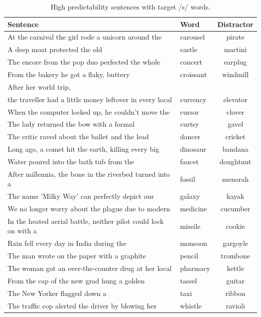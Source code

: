 \begin{table}[!ht]
\caption{High predictability sentences with target /s/ words.}
\label{tbl:senthighs}
\small
\centering
\begin{tabular}{llc}
\toprule
Sentence                                                                     & Word        & Distractor  \\
\midrule
At the carnival the girl rode a unicorn around the & carousel & pirate \\
A deep moat protected the old & castle & martini \\
The encore from the pop duo perfected the whole & concert & earplug \\
From the bakery he got a flaky, buttery & croissant & windmill \\
After her world trip, & & \\
the traveller had a little money leftover in every local & currency & elevator \\
When the computer locked up, he couldn't move the & cursor & clover \\
The lady returned the bow with a formal & curtsy & gavel \\
The critic raved about the ballet and the lead & dancer & cricket \\
Long ago, a comet hit the earth, killing every big & dinosaur & bandana \\
Water poured into the bath tub from the & faucet & doughtnut \\
After millennia, the bone in the riverbed turned into a & fossil & menorah \\
The name 'Milky Way' can perfectly depict our & galaxy & kayak \\
We no longer worry about the plague due to modern & medicine & cucumber \\
In the heated aerial battle, neither pilot could lock on with a & missile & cookie \\
Rain fell every day in India during the & monsoon & gargoyle \\
The man wrote on the paper with a graphite & pencil & trombone \\
The woman got an over-the-counter drug at her local & pharmacy & kettle \\
From the cap of the new grad hung a golden & tassel & guitar \\
The New Yorker flagged down a & taxi & ribbon \\
The traffic cop alerted the driver by blowing her & whistle & ravioli \\
\bottomrule
\end{tabular}
\end{table}

